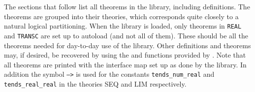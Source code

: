 \label{theorems}

The sections that follow list all theorems in the  library,
including definitions. The theorems are grouped into their theories, which
corresponds quite closely to a natural logical partitioning. When the
 library is loaded, only theorems in {\tt REAL} and {\tt TRANSC} are
set up to autoload (and not all of them). These should be all the theorems
needed for day-to-day use of the library. Other definitions and theorems may,
if desired, be recovered by using the  and  functions
provided by \ML. Note that all theorems are printed with the interface map set
up as done by the library. In addition the symbol {\tt -->} is used for the
constants {\tt tends\_num\_real} and {\tt tends\_real\_real} in the theories
{SEQ} and {LIM} respectively.
